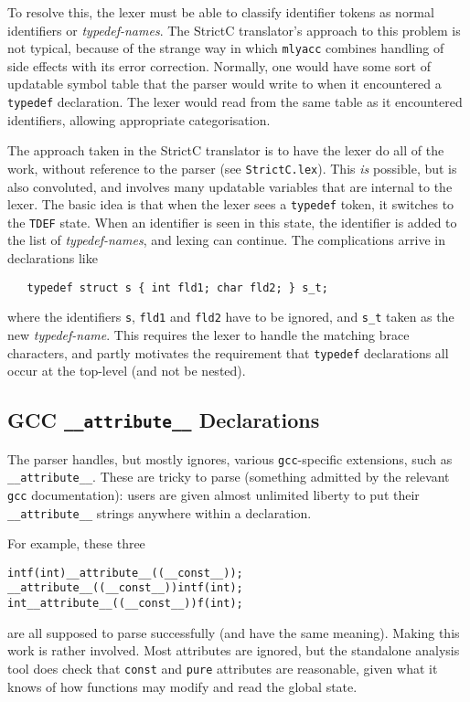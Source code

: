 \documentclass{article}
\newcommand{\strictc}{\textsf{StrictC}}
\newcommand{\srcfile}[1]{\texttt{#1}}
\begin{document}
To resolve this, the lexer must be able to classify identifier tokens as
normal identifiers or \textit{typedef-names}.  The \strictc{}
translator's approach to this problem is not typical, because of the
strange way in which \texttt{mlyacc} combines handling of side effects
with its error correction.  Normally, one would have some sort of
updatable symbol table that the parser would write to when it
encountered a \texttt{typedef} declaration.  The lexer would read from
the same table as it encountered identifiers, allowing appropriate
categorisation.

The approach taken in the \strictc{} translator is to have the lexer do
all of the work, without reference to the parser (see
\srcfile{StrictC.lex}).  This \emph{is} possible, but is also convoluted,
and involves many updatable variables that are internal to the lexer.
The basic idea is that when the lexer sees a \texttt{typedef} token,
it switches to the \texttt{TDEF} state.  When an identifier is seen in
this state, the identifier is added to the list of
\textit{typedef-names}, and lexing can continue.  The complications
arrive in declarations like
\begin{verbatim}
   typedef struct s { int fld1; char fld2; } s_t;
\end{verbatim}
where the identifiers \texttt{s}, \texttt{fld1} and \texttt{fld2} have
to be ignored, and \texttt{s_t} taken as the new \emph{typedef-name}.
This requires the lexer to handle the matching brace characters, and
partly motivates the requirement that \texttt{typedef} declarations
all occur at the top-level (and not be nested).

\subsection{GCC \texttt{__attribute__} Declarations}
\label{sec:gcc-attributes}

The parser handles, but mostly ignores, various \texttt{gcc}-specific
extensions, such as \texttt{__attribute__}.  These are tricky to parse
(something admitted by the relevant \texttt{gcc} documentation): users
are given almost unlimited liberty to put their \texttt{__attribute__}
strings anywhere within a declaration.

\smallskip\noindent
For example, these three
\begin{alltt}
   int f(int) __attribute__((__const__));
   __attribute__((__const__)) int f(int);
   int __attribute__((__const__)) f(int);
\end{alltt}
are all supposed to parse successfully (and have the same meaning).
Making this work is rather involved.  Most attributes are ignored, but
the standalone analysis tool does check that \texttt{const} and
\texttt{pure} attributes are reasonable, given what it knows of how
functions may modify and read the global state.



\end{document}
